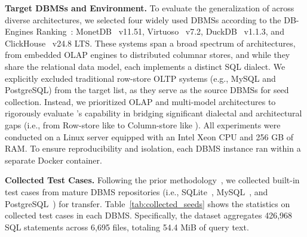 \documentclass[sigconf,review,anonymous]{acmart}
\begin{document}
\textbf{Target DBMSs and Environment.}
To evaluate the generalization of \tool{} across diverse architectures, we selected four widely used DBMSs according to the DB-Engines Ranking~\cite{dbengines}: MonetDB~\cite{monetdb} v11.51, Virtuoso~\cite{virtuoso} v7.2, DuckDB~\cite{duckdb_git} v1.1.3, and ClickHouse~\cite{clickhouse} v24.8 LTS. These systems span a broad spectrum of architectures, from embedded OLAP engines to distributed columnar stores, and while they share the relational data model, each implements a distinct SQL dialect.
We explicitly excluded traditional row-store OLTP systems (e.g., MySQL and PostgreSQL) from the target list, as they serve as the source DBMSs for seed collection. Instead, we prioritized OLAP and multi-model architectures to rigorously evaluate \tool{}'s capability in bridging significant dialectal and architectural gaps (i.e., from Row-store like \mysql{} to Column-store like \duckdb{}).
All experiments were conducted on a Linux server equipped with an Intel Xeon CPU and 256 GB of RAM. To ensure reproducibility and isolation, each DBMS instance ran within a separate Docker container.

\textbf{Collected Test Cases.}
Following the prior methodology~\cite{fu2024sedar}, we collected built-in test cases from mature DBMS repositories (i.e., SQLite~\cite{sqlite}, MySQL~\cite{mysql}, and PostgreSQL~\cite{pg}) for transfer. Table~\ref{tab:collected_seeds} shows the statistics on collected test cases in each DBMS.
Specifically, the dataset aggregates 426,968 SQL statements across 6,695 files, totaling 54.4 MiB of query text. 
\end{document}
